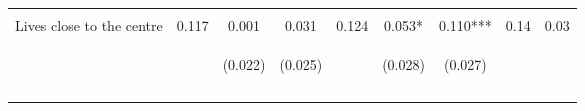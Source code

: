 \begin{tabular}{lcccccccc}
 & \begin{footnotesize}\end{footnotesize} & \begin{footnotesize}[0.041]\end{footnotesize} & \begin{footnotesize}[0.001]\end{footnotesize} & \begin{footnotesize}\end{footnotesize} & \begin{footnotesize}[1.000]\end{footnotesize} & \begin{footnotesize}[0.371]\end{footnotesize} & \begin{footnotesize}\end{footnotesize} & \begin{footnotesize}\end{footnotesize}\\
\noalign{\smallskip}Lives close to the centre & 0.117 & 0.001 & 0.031 & 0.124 & 0.053* & 0.110*** & 0.14 & 0.03\\
 & \begin{footnotesize}\end{footnotesize} & \begin{footnotesize}(0.022)\end{footnotesize} & \begin{footnotesize}(0.025)\end{footnotesize} & \begin{footnotesize}\end{footnotesize} & \begin{footnotesize}(0.028)\end{footnotesize} & \begin{footnotesize}(0.027)\end{footnotesize} & \begin{footnotesize}\end{footnotesize} & \begin{footnotesize}\end{footnotesize}\\
 & \begin{footnotesize}\end{footnotesize} & \begin{footnotesize}[0.240]\end{footnotesize} & \begin{footnotesize}[0.046]\end{footnotesize} & \begin{footnotesize}\end{footnotesize} & \begin{footnotesize}[0.435]\end{footnotesize} & \begin{footnotesize}[0.001]\end{footnotesize} & \begin{footnotesize}\end{footnotesize} & \begin{footnotesize}\end{footnotesize}\\
\noalign{\smallskip}\hline\end{tabular}\\
